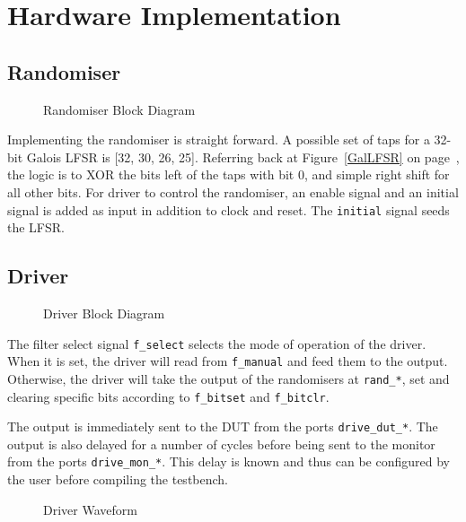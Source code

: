 \chapter{Hardware Implementation}

\section{Randomiser}

\begin{figure}[H]
  \centering
  
  \caption{Randomiser Block Diagram}
  \label{RandomiserBlk}
\end{figure}

Implementing the randomiser is straight forward.
A possible set of taps for a 32-bit Galois LFSR is [32, 30, 26, 25].
Referring back at Figure~\ref{GalLFSR} on page~\pageref{GalLFSR},
the logic is to XOR the bits left of the taps with bit 0, and simple right shift for all other bits.
For driver to control the randomiser, an enable signal and an initial signal is added as input in addition to clock and reset.
The \texttt{initial} signal seeds the LFSR.

\section{Driver}

\begin{figure}[H]
  \centering
  
  \caption{Driver Block Diagram}
  \label{DriverBlk}
\end{figure}

The filter select signal \texttt{f\_select} selects the mode of operation of the driver.
When it is set, the driver will read from \texttt{f\_manual} and feed them to the output.
Otherwise, the driver will take the output of the randomisers at \texttt{rand\_*}, set and clearing specific bits according to \texttt{f\_bitset} and \texttt{f\_bitclr}.

The output is immediately sent to the DUT from the ports \texttt{drive\_dut\_*}.
The output is also delayed for a number of cycles before being sent to the monitor from the ports \texttt{drive\_mon\_*}.
This delay is known and thus can be configured by the user before compiling the testbench.

\begin{figure}[H]
  \centering
  
  \caption{Driver Waveform}
  \label{DriveWave}
\end{figure}

